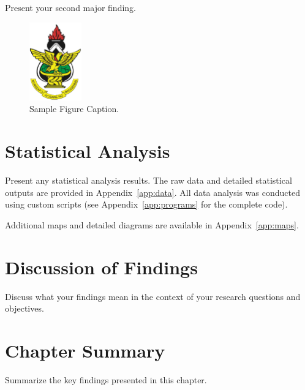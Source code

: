 Present your second major finding.

\begin{figure}[htbp]
\centering
\includegraphics[width=0.2\textwidth]{images/knust-logo.png}
\singlespace
\caption{Sample Figure Caption.}
\label{fig:sample}
\endsinglespace
\end{figure}

\section{Statistical Analysis}

Present any statistical analysis results. The raw data and detailed statistical outputs are provided in Appendix~\ref{app:data}. All data analysis was conducted using custom scripts (see Appendix~\ref{app:programs} for the complete code).

Additional maps and detailed diagrams are available in Appendix~\ref{app:maps}.

\section{Discussion of Findings}

Discuss what your findings mean in the context of your research questions and objectives.

\section{Chapter Summary}

Summarize the key findings presented in this chapter.
